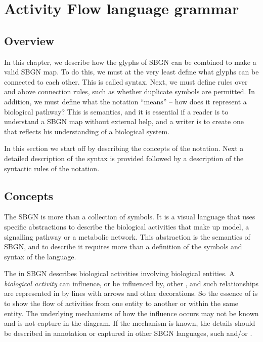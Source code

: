 \chapter{Activity Flow language grammar}
\label{chp:af:grammar}

\section{Overview}
In this chapter, we describe how the glyphs of SBGN can be combined to make a valid SBGN map. To do this, we must at the very least define what glyphs can be connected to each other. This is called syntax. Next, we must define rules over and above connection rules, such as whether duplicate symbols are permitted. In addition, we must define what the notation ``means'' -- how does it represent a biological pathway? This is semantics, and it is essential if a reader is to understand a SBGN map without external help, and a writer is to create one that reflects his understanding of a biological system.

In this section we start off by describing the concepts of the \AF{} notation. Next a detailed description of the syntax is provided
followed by a description of the syntactic rules of the notation.

\section{Concepts}

The SBGN \AF{} is more than a collection of symbols. It is a visual language that uses specific abstractions to describe the biological activities that make up  model, a signalling pathway or a metabolic network. This abstraction is the semantics of SBGN, and to describe it requires more than a definition of the symbols and syntax of the language. 

The \AF{} in SBGN describes biological activities involving biological entities. A \emph{biological activity} can influence, or be influenced by, other , and such relationships are represented in \AF by lines with arrows and other decorations. So the essence of \AF is to show the flow of activities from one entity to another or within the same entity. The underlying mechanisms of how the influence occurs may not be known and is not capture in the diagram. If the mechanism is known, the details should be described in annotation or captured in other SBGN languages, such \PD and/or \ER.





